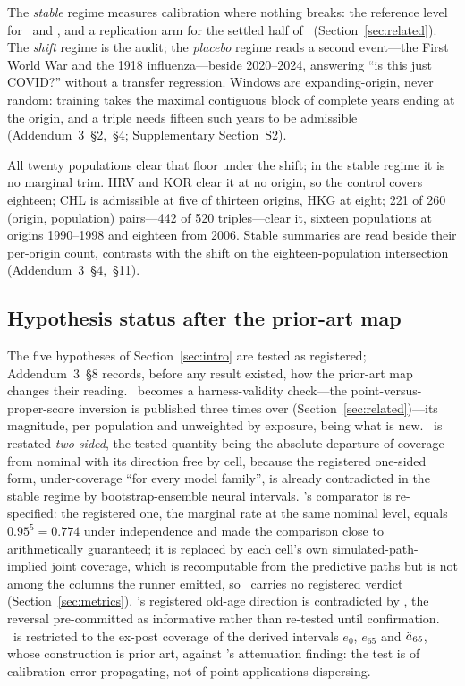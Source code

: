 The \emph{stable} regime measures calibration where nothing breaks: the
reference level for \Htwo\ and \Hfive, and a replication arm for the settled
half of \Htwo\ (Section~\ref{sec:related}). The \emph{shift} regime is the
audit; the \emph{placebo} regime reads a second event---the First World War and
the 1918 influenza---beside 2020--2024, answering ``is this just COVID?''
without a transfer regression. Windows are expanding-origin, never random:
training takes the maximal contiguous block of complete years ending at the
origin, and a triple needs fifteen such years to be admissible
(Addendum~3~\S2,~\S4; Supplementary Section~S2).

All twenty populations clear that floor under the shift; in the stable regime it
is no marginal trim. HRV and KOR clear it at no origin, so the control covers
eighteen; CHL is admissible at five of thirteen origins, HKG at eight; 221 of
260 (origin, population) pairs---442 of 520 triples---clear it, sixteen
populations at origins 1990--1998 and eighteen from 2006. Stable summaries are
read beside their per-origin count, contrasts with the shift on the
eighteen-population intersection (Addendum~3~\S4,~\S11).

\subsection{Hypothesis status after the prior-art map}
\label{sec:design-status}

The five hypotheses of Section~\ref{sec:intro} are tested as registered;
Addendum~3~\S8 records, before any result existed, how the prior-art map changes
their reading. \Hone\ becomes a harness-validity check---the
point-versus-proper-score inversion is published three times over
(Section~\ref{sec:related})---its magnitude, per population and unweighted by
exposure, being what is new. \Htwo\ is restated \emph{two-sided}, the tested
quantity being the absolute departure of coverage from nominal with its
direction free by cell, because the registered one-sided form, under-coverage
``for every model family'', is already contradicted in the stable regime by
bootstrap-ensemble neural intervals. \Hthree's comparator is re-specified: the
registered one, the marginal rate at the same nominal level, equals
$0.95^5=0.774$ under independence and made the comparison close to
arithmetically guaranteed; it is replaced by each cell's own
simulated-path-implied joint coverage, which is recomputable from the predictive
paths but is not among the columns the runner emitted, so \Hthree\ carries no
registered verdict (Section~\ref{sec:metrics}). \Hfour's registered old-age
direction is contradicted by \citet{dowd2010backtesting}, the reversal
pre-committed as informative rather than re-tested until confirmation. \Hfive\
is restricted to the ex-post coverage of the derived intervals $e_0$, $e_{65}$
and $\ddot{a}_{65}$, whose construction is prior art, against
\citet{cairns2011mortality}'s attenuation finding: the test is of calibration
error propagating, not of point applications dispersing.

